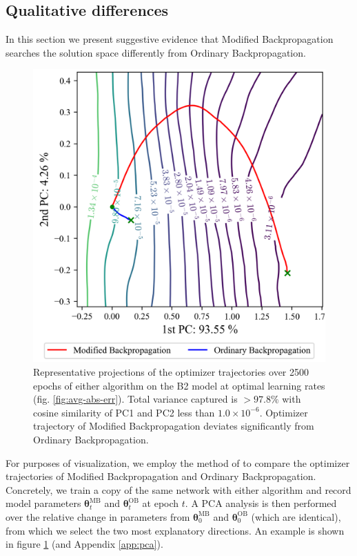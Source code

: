 \documentclass{article}
\theoremstyle{plain}
\theoremstyle{definition}
\theoremstyle{remark}
\newcommand{\vtheta}{\bm{\theta}}
\begin{document}

\subsection{Qualitative differences}
\label{sec:experiment-qual}
%
In this section we present suggestive evidence that Modified Backpropagation searches the solution space differently from Ordinary Backpropagation.
%
\begin{figure}[h]
    \centering
    \includegraphics[width=0.9\columnwidth]{./resources/pca_b2.png}
    \caption{Representative projections of the optimizer trajectories over 2500 epochs of either algorithm on the B2 model at optimal learning rates (fig. \ref{fig:avg-abs-err}). Total variance captured is $>97.8\%$ with cosine similarity of PC1 and PC2 less than $1.0\times10^{-6}$. Optimizer trajectory of Modified Backpropagation deviates significantly from Ordinary Backpropagation.}
    \label{fig:pca-b2}
\end{figure}

For purposes of visualization, we employ the method of \cite{li-visualizing} to compare the optimizer trajectories of Modified Backpropagation and Ordinary Backpropagation. Concretely, we train a copy of the same network with either algorithm and record model parameters $\vtheta_t^{\mathrm{MB}}$ and $\vtheta_t^{\mathrm{OB}}$ at epoch $t$. A PCA analysis is then performed over the relative change in parameters from $\vtheta_0^{\mathrm{MB}}$ and $\vtheta_0^{\mathrm{OB}}$ (which are identical), from which we select the two most explanatory directions. An example is shown in figure \ref{fig:pca-b2} (and Appendix \ref{app:pca}).
\end{document}
